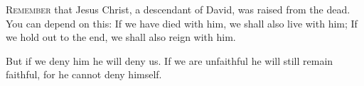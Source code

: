
\lettrine{R}{emember} that Jesus Christ, a descendant of David, was raised from the dead. You can depend on this:   If we have died with him,
      we shall also live with him;
   If we hold out to the end,
      we shall also reign with him.

But if we deny him he will deny us. If we are unfaithful he will still remain faithful, for he cannot deny himself.